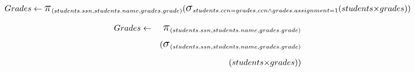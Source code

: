 \documentclass[]{article}
\newcommand{\select}{\mbox{\Large$\sigma$}}
\newcommand{\cross}{\mbox{$\times$}}
\newcommand{\project}{\mbox{\Large$\pi$}}
\begin{document}
\begin{displaymath}
	Grades \leftarrow \project_{(students.ssn, students.name, grades.grade)} \\
	(\select_{students.ccn = grades.ccn \wedge grades.assignment = 1} \\
	(students \cross grades)) \\
\end{displaymath}

\begin{eqnarray*}
	Grades & \leftarrow & \project_{(students.ssn, students.name, grades.grade)}  \\
	&            &(\select_{(students.ssn, students.name, grades.grade)}  \\
	&            &          (students \cross grades))
\end{eqnarray*}
\end{document}
